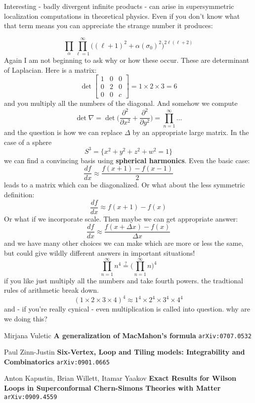 \documentclass[12pt]{article}
\begin{document}
\newpage

\noindent Interesting - badly divergent infinite products - can arise in supersymmetric localization computations in theoretical physics.  Even if you don't know what that term means you can appreciate the strange number it produces:

$$  \prod_\alpha \prod_{\ell=1}^\infty \big( (\ell+1)^2 + \alpha(\sigma_0)^2\big)^{2\ell(\ell+2)}$$
Again I am not beginning to ask why or how these occur.  These are determinant of Laplacian.  Here is a matrix:
$$ \det \left[ 
\begin{array}{ccc}
1 & 0 & 0 \\ 0 & 2 & 0 \\ 0 & 0 & c
\end{array}
\right]  = 1 \times 2 \times  3 = 6$$
and you multiply all the numbers of the diagonal.  And somehow we compute 
$$ \det \nabla = \det \big( \frac{\partial^2}{\partial x^2}  +  \frac{\partial^2}{\partial y^2} \big) = \prod_{n=1}^\infty \dots $$
and the question is how we can replace $\Delta$ by an appropriate large matrix.  In the case of a sphere $$ S^3 = \{ x^2 + y^2 + z^2 + w^2 = 1\}$$
we can find a convincing basis using \textbf{spherical harmonics}.  Even the basic case:
$$ \frac{df}{dx} \approx \frac{f(x+1)- f(x-1)}{2} $$
leads to a matrix which can be diagonalized.  Or what about the less symmetric definition:
$$ \frac{df}{dx} \approx f(x+1)- f(x) $$
Or what if we incorporate scale.  Then maybe we can get appropriate answer:
$$ \frac{df}{dx} \approx \frac{f(x + \Delta x) - f(x)}{\Delta x} $$
and we have many other choices we can make which are more or less the same, but could give wildly different answers in important situations!
$$ \prod_{n=1}^\infty n^4 \stackrel{?}{=}
\big(  \prod_{n=1}^\infty n \big)^4$$
if you like just multiply all the numbers and take fourth powers.  the tradtional rules of arithmetic break down.
$$ (1 \times 2 \times 3\times 4)^4 \approx 
1^4 \times 2^4 \times 3^4 \times 4^4 $$
and - if you're really cynical - even multiplication is called into question.  why are we doing this?

\newpage 

\selectfont \fontsize{12}{10}\selectfont


\begin{thebibliography}{}

\item Mirjana Vuletic \textbf{A generalization of MacMahon's formula} \texttt{arXiv:0707.0532}

\item Paul Zinn-Justin \textbf{Six-Vertex, Loop and Tiling models: Integrability and Combinatorics} \texttt{arXiv:0901.0665}

\item Anton Kapustin, Brian Willett, Itamar Yaakov \textbf{Exact Results for Wilson Loops in Superconformal Chern-Simons Theories with Matter} \texttt{arXiv:0909.4559}


\end{thebibliography}
\end{document}
